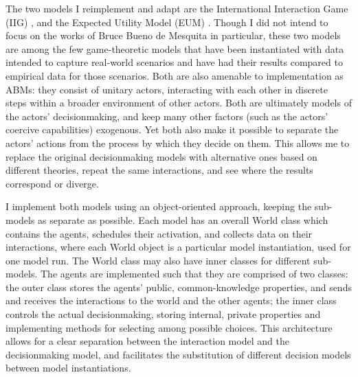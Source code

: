 The two models I reimplement and adapt are the International Interaction Game (IIG) \citep{bdm_1992,bennett_2000}, and the Expected Utility Model (EUM) \citep{bdm_1994,bdm_1997,bdm_2002}. Though I did not intend to focus on the works of Bruce Bueno de Mesquita in particular, these two models are among the few game-theoretic models that have been instantiated with data intended to capture real-world scenarios and have had their results compared to empirical data for those scenarios. Both are also amenable to implementation as ABMs: they consist of unitary actors, interacting with each other in discrete steps within a broader environment of other actors. Both are ultimately models of the actors' decisionmaking, and keep many other factors (such as the actors' coercive capabilities) exogenous. Yet both also make it possible to separate the actors' actions from the process by which they decide on them. This allows me to replace the original decisionmaking models with alternative ones based on different theories, repeat the same interactions, and see where the results correspond or diverge.

I implement both models using an object-oriented approach, keeping the sub-models as separate as possible. Each model has an overall World class which contains the agents, schedules their activation, and collects data on their interactions, where each World object is a particular model instantiation, used for one model run. The World class may also have inner classes for different sub-models. The agents are implemented such that they are comprised of two classes: the outer class stores the agents' public, common-knowledge properties, and sends and receives the interactions to the world and the other agents; the inner class controls the actual decisionmaking, storing internal, private properties and implementing methods for selecting among possible choices. This architecture allows for a clear separation between the interaction model and the decisionmaking model, and facilitates the substitution of different decision models between model instantiations.


